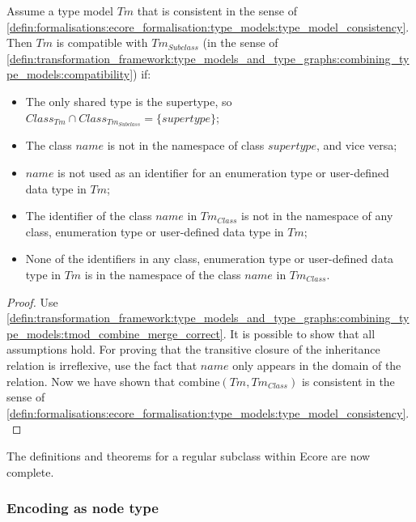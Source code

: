 \begin{thm}
\label{defin:library_of_transformations:type_level_transformations:regular_subclasses:tmod_subclass_combine_correct}
Assume a type model $Tm$ that is consistent in the sense of \cref{defin:formalisations:ecore_formalisation:type_models:type_model_consistency}. Then $Tm$ is compatible with $Tm_{Subclass}$ (in the sense of \cref{defin:transformation_framework:type_models_and_type_graphs:combining_type_models:compatibility}) if:
\begin{itemize}
    \item The only shared type is the supertype, so $Class_{Tm} \cap Class_{Tm_{Subclass}} = \{ supertype \}$;
    \item The class $name$ is not in the namespace of class $supertype$, and vice versa;
    \item $name$ is not used as an identifier for an enumeration type or user-defined data type in $Tm$;
    \item The identifier of the class $name$ in $Tm_{Class}$ is not in the namespace of any class, enumeration type or user-defined data type in $Tm$;
    \item None of the identifiers in any class, enumeration type or user-defined data type in $Tm$ is in the namespace of the class $name$ in $Tm_{Class}$.
\end{itemize}
\end{thm}

\begin{proof}
Use \cref{defin:transformation_framework:type_models_and_type_graphs:combining_type_models:tmod_combine_merge_correct}. It is possible to show that all assumptions hold. For proving that the transitive closure of the inheritance relation is irreflexive, use the fact that $name$ only appears in the domain of the relation. Now we have shown that $\mathrm{combine}(Tm, Tm_{Class})$ is consistent in the sense of \cref{defin:formalisations:ecore_formalisation:type_models:type_model_consistency}.
\end{proof}

The definitions and theorems for a regular subclass within Ecore are now complete. 

\subsubsection{Encoding as node type}

